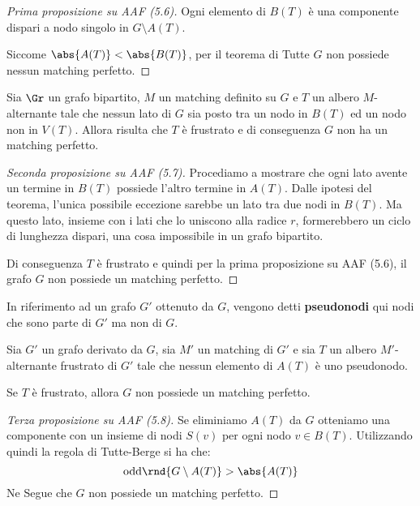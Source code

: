 \documentclass[\main/main.tex]{subfiles}
\begin{document}
\begin{proof}[Prima proposizione su AAF (5.6)]
	Ogni elemento di \(B(T)\) è una componente dispari a nodo singolo in \(G \setminus A(T)\).

	Siccome \(\abs{A(T)} < \abs{B(T)}\), per il teorema di Tutte \(G\) non possiede nessun matching perfetto.
\end{proof}
\begin{proposition}
	Sia \(\Gr \) un grafo bipartito, \(M\) un matching definito su \(G\) e \(T\) un albero \(M\)-alternante tale che nessun lato di \(G\) sia posto tra un nodo in \(B(T)\) ed un nodo non in \(V(T)\). Allora risulta che \(T\) è frustrato e di conseguenza \(G\) non ha un matching perfetto.
\end{proposition}
\begin{proof}[Seconda proposizione su AAF (5.7)]
	Procediamo a mostrare che ogni lato avente un termine in \(B(T)\) possiede l'altro termine in \(A(T)\). Dalle ipotesi del teorema, l'unica possibile eccezione sarebbe un lato tra due nodi in \(B(T)\). Ma questo lato, insieme con i lati che lo uniscono alla radice \(r\), formerebbero un ciclo di lunghezza dispari, una cosa impossibile in un grafo bipartito.

	Di conseguenza \(T\) è frustrato e quindi per la prima proposizione su AAF (5.6), il grafo \(G\) non possiede un matching perfetto.
\end{proof}
\begin{definition}[Pseudonodo]
	In riferimento ad un grafo \(G'\) ottenuto da \(G\), vengono detti \textbf{pseudonodi} qui nodi che sono parte di \(G'\) ma non di \(G\).
\end{definition}
\begin{proposition}
	Sia \(G'\) un grafo derivato da \(G\), sia \(M'\) un matching di \(G'\) e sia \(T\) un albero \(M'\)-alternante frustrato di \(G'\) tale che nessun elemento di \(A(T)\) è uno pseudonodo.

	Se \(T\) è frustrato, allora \(G\) non possiede un matching perfetto.
\end{proposition}
\begin{proof}[Terza proposizione su AAF (5.8)]
	Se eliminiamo \(A(T)\) da \(G\) otteniamo una componente con un insieme di nodi \(S(v)\) per ogni nodo \(v \in B(T)\). Utilizzando quindi la regola di Tutte-Berge si ha che:
	\[
		\text{odd}\rnd{G \setminus A(T)} > \abs{A(T)}
	\]
	Ne Segue che \(G\) non possiede un matching perfetto.
\end{proof}
\end{document}
